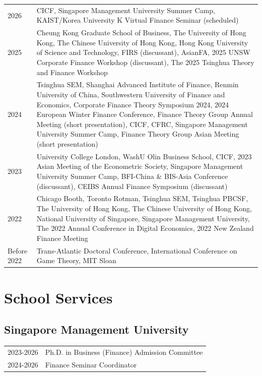 \documentclass[11pt]{article}
\begin{document}
\begin{longtable}[l]{@{}p{} p{}}

    2026 & CICF, Singapore Management University Summer Camp, KAIST/Korea University K Virtual Finance Seminar (scheduled) \\

    2025 & Cheung Kong Graduate School of Business, The University of Hong Kong, The Chinese University of Hong Kong, Hong Kong University of Science and Technology, FIRS (discussant), AsianFA, 2025 UNSW Corporate Finance Workshop (discussant), The 2025 Tsinghua Theory and Finance Workshop \\

    2024 & Tsinghua SEM, Shanghai Advanced Institute of Finance, Renmin University of China, Southwestern University of Finance and Economics, Corporate Finance Theory Symposium 2024, 2024 European Winter Finance Conference, Finance Theory Group Annual Meeting (short presentation), CICF, CFRC, Singapore Management University Summer Camp, Finance Theory Group Asian Meeting (short presentation) \\

    2023 & University College London, WashU Olin Business School, CICF, 2023 Asian Meeting of the Econometric Society, Singapore Management University Summer Camp, BFI-China \& BIS-Asia Conference (discussant), CEIBS Annual Finance Symposium (discussant) \\

    2022 & Chicago Booth, Toronto Rotman, Tsinghua SEM, Tsinghua PBCSF, The University of Hong Kong, The Chinese University of Hong Kong, National University of Singapore, Singapore Management University, The 2022 Annual Conference in Digital Economics, 2022 New Zealand Finance Meeting \\

    Before 2022 & Trans-Atlantic Doctoral Conference, International Conference on Game Theory, MIT Sloan \\

\end{longtable}


\section*{School Services}
\label{School Services}

\subsection*{Singapore Management University}
\begin{longtable}[l]{@{}p{} p{}}
    2023-2026 & Ph.D. in Business (Finance) Admission Committee \\
    2024-2026 & Finance Seminar Coordinator \\
\end{longtable}
\end{document}
